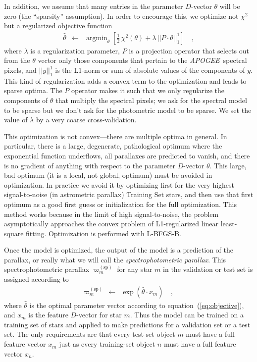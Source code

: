 \documentclass[modern]{aastex62}
\newcommand{\equationname}{equation}
\newcommand{\code}[1]{\texttt{\detokenize{#1}}}
\newcommand{\acronym}[1]{{\small{#1}}}
\newcommand{\project}[1]{\textsl{#1}}
\newcommand{\apogee}{\project{\acronym{APOGEE}}}
\DeclareMathOperator*{\argmin}{argmin}
\newcommand{\sparallax}{\varpi^{(\mathrm{sp})}}
\begin{document}
In addition, we assume that many entries in the parameter $D$-vector $\theta$ will be zero
(the ``sparsity'' assumption).
In order to encourage this, we optimize not $\chi^2$ but a regularized objective function
\begin{eqnarray}
\hat{\theta} &\leftarrow& \argmin_{\theta}\left[\frac{1}{2}\,\chi^2(\theta) + \lambda\,||P\cdot\theta||_1^1\right]
\label{eq:objective}\quad ,
\end{eqnarray}
where
$\lambda$ is a regularization parameter,
$P$ is a projection operator that selects out from the $\theta$ vector only those components
that pertain to the \apogee\ spectral pixels,
and $||y||_1^1$ is the L1-norm or sum of absolute values of the components of $y$.
This kind of regularization adds a convex term to the optimization and leads to
sparse optima.
The $P$ operator makes it such that we only regularize the components of $\theta$ that multiply
the spectral pixels; we ask for the spectral model to be sparse but we don't ask for the photometric
model to be sparse.
We set the value of $\lambda$ by a 
very coarse cross-validation.

This optimization is not convex---there are multiple optima in general.
In particular, there is a large, degenerate, pathological optimum where
the exponential function underflows, all parallaxes are predicted to vanish,
and there is no gradient of anything with respect to the parameter $D$-vector $\theta$.
This large, bad optimum (it is a local, not global, optimum) must be avoided in optimization.
In practice we avoid it by optimizing first for the very highest signal-to-noise
(in astrometric parallax) Training Set stars, and then use that first optimum as a
good first guess or initialization for the full optimization.
This method works because in the limit of high signal-to-noise, the problem asymptotically approaches
the convex problem of L1-regularized linear least-square fitting.
Optimization is performed with \code{scipy.optimize} \acronym{L-BFGS-B}.

Once the model is optimized, the output of the model is a prediction of the parallax,
or really what we will call the \emph{spectrophotometric parallax}.
This spectrophotometric parallax
$\sparallax_m$ for any star $m$ in the validation or test set is
assigned according to
\begin{eqnarray}
\sparallax_m &\leftarrow& \exp(\hat{\theta}\cdot x_m)
\quad ,
\end{eqnarray}
where
$\hat{\theta}$ is the optimal parameter vector according
to \equationname~(\ref{eq:objective}),
and
$x_m$ is the feature $D$-vector for star $m$.
Thus the model can be trained on a training set of stars and applied to make
predictions for a validation set or a test set.
The only requirements are that every test-set object $m$  must have a full feature
vector $x_m$ just as every training-set object $n$ must have a full feature
vector $x_n$.
\end{document}
